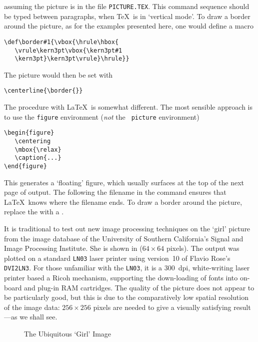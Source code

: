 \noindent assuming the picture is in the file {\tt PICTURE.TEX}.
This command sequence should be typed between paragraphs, when \TeX\
is in `vertical mode'. To draw a border around the picture, as for
the examples presented here, one would define a macro \cmd{border}

\begin{verbatim}
\def\border#1{\vbox{\hrule\hbox{
   \vrule\kern3pt\vbox{\kern3pt#1
   \kern3pt}\kern3pt\vrule}\hrule}}
\end{verbatim}

\noindent The picture would then be set with

\begin{verbatim}
\centerline{\border{}}
\end{verbatim}

The procedure with \LaTeX\ is somewhat different. The most sensible
approach is to use the {\tt figure} environment ({\em not\/} the {\tt
picture} environment)

\begin{verbatim}
\begin{figure}
   \centering
   \mbox{\relax}
   \caption{...}
\end{figure}
\end{verbatim}

\noindent This generates a `floating' figure, which usually surfaces at
the top of the next page of output. The \cmd{relax} following the
filename in the  command ensures that \LaTeX\ knows where the
filename ends. To draw a border around the picture, replace the
\cmd{mbox} with a . 

It is traditional to test out new image processing techniques on the
`girl' picture from the image database of the University of Southern
California's Signal and Image Processing Institute. She is shown
in \fig{1} ($64 \times 64$ pixels). The output was plotted on a standard
{\tt LN03} laser printer using version~10 of Flavio Rose's {\tt
DVI2LN3}. For those unfamiliar with the {\tt LN03}, it is a 300~dpi,
white-writing laser printer based a Ricoh mechanism, supporting the
down-loading of fonts into on-board and plug-in RAM cartridges. The 
quality of the picture does not appear to be particularly good, but this 
is due to the comparatively low spatial resolution of the image data:
$256 \times 256$ pixels are needed to give a visually satisfying 
result---as we shall see.

\begin{figure}
   \centering
   \fbox{\relax}
   \caption{The Ubiquitous `Girl' Image}
\end{figure}

